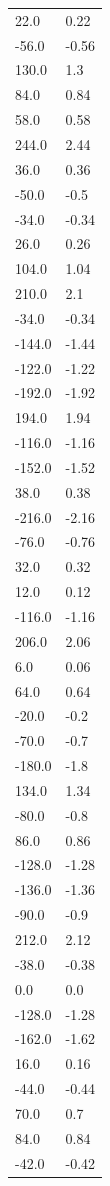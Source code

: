 \begin{longtable}{ll}
22.0 & 0.22 \\
-56.0 & -0.56 \\
130.0 & 1.3 \\
84.0 & 0.84 \\
58.0 & 0.58 \\
244.0 & 2.44 \\
36.0 & 0.36 \\
-50.0 & -0.5 \\
-34.0 & -0.34 \\
26.0 & 0.26 \\
104.0 & 1.04 \\
210.0 & 2.1 \\
-34.0 & -0.34 \\
-144.0 & -1.44 \\
-122.0 & -1.22 \\
-192.0 & -1.92 \\
194.0 & 1.94 \\
-116.0 & -1.16 \\
-152.0 & -1.52 \\
38.0 & 0.38 \\
-216.0 & -2.16 \\
-76.0 & -0.76 \\
32.0 & 0.32 \\
12.0 & 0.12 \\
-116.0 & -1.16 \\
206.0 & 2.06 \\
6.0 & 0.06 \\
64.0 & 0.64 \\
-20.0 & -0.2 \\
-70.0 & -0.7 \\
-180.0 & -1.8 \\
134.0 & 1.34 \\
-80.0 & -0.8 \\
86.0 & 0.86 \\
-128.0 & -1.28 \\
-136.0 & -1.36 \\
-90.0 & -0.9 \\
212.0 & 2.12 \\
-38.0 & -0.38 \\
0.0 & 0.0 \\
-128.0 & -1.28 \\
-162.0 & -1.62 \\
16.0 & 0.16 \\
-44.0 & -0.44 \\
70.0 & 0.7 \\
84.0 & 0.84 \\
-42.0 & -0.42 \\

\end{longtable}
